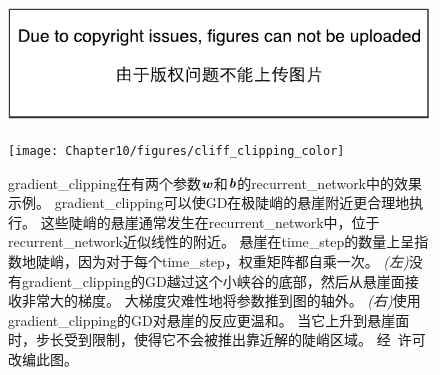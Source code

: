 \begin{figure}[!htb]
\ifOpenSource
\centerline{\includegraphics{figure.pdf}}
\else
\centerline{\texttt{[image: Chapter10/figures/cliff\_clipping\_color]}}
\fi
\caption{\gls{gradient_clipping}在有两个参数$\boldsymbol{\mathit{w}}$和$\boldsymbol{\mathit{b}}$的\gls{recurrent_network}中的效果示例。
\gls{gradient_clipping}可以使\gls{GD}在极陡峭的悬崖附近更合理地执行。
这些陡峭的悬崖通常发生在\gls{recurrent_network}中，位于\gls{recurrent_network}近似线性的附近。
悬崖在\gls{time_step}的数量上呈指数地陡峭，因为对于每个\gls{time_step}，权重矩阵都自乘一次。
\emph{(左)}没有\gls{gradient_clipping}的\gls{GD}越过这个小峡谷的底部，然后从悬崖面接收非常大的梯度。
大梯度灾难性地将参数推到图的轴外。
\emph{(右)}使用\gls{gradient_clipping}的\gls{GD}对悬崖的反应更温和。
当它上升到悬崖面时，步长受到限制，使得它不会被推出靠近解的陡峭区域。
经~\citet{Pascanu+al-ICML2013-small}许可改编此图。
}
\label{fig:chap10_cliff_clipping_color}
\end{figure}



